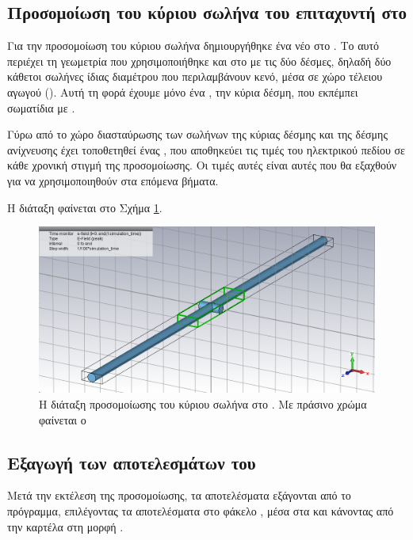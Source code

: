 \subsection{Προσομοίωση του κύριου σωλήνα του επιταχυντή στο }
Για την προσομοίωση του κύριου σωλήνα δημιουργήθηκε ένα νέο  στο .
Το  αυτό περιέχει τη γεωμετρία που χρησιμοποιήθηκε και στο  με τις δύο δέσμες, δηλαδή δύο κάθετοι σωλήνες ίδιας διαμέτρου που περιλαμβάνουν κενό, μέσα σε χώρο τέλειου αγωγού ().
Αυτή τη φορά έχουμε μόνο ένα , την κύρια δέσμη, που εκπέμπει σωματίδια με .

Γύρω από το χώρο διασταύρωσης των σωλήνων της κύριας δέσμης και της δέσμης ανίχνευσης έχει τοποθετηθεί ένας , που αποθηκεύει τις τιμές του ηλεκτρικού πεδίου σε κάθε χρονική στιγμή της προσομοίωσης. 
Οι τιμές αυτές είναι αυτές που θα εξαχθούν για να χρησιμοποιηθούν στα επόμενα βήματα.

Η διάταξη φαίνεται στο Σχήμα \ref{fig:CST-export-main-beam-project-efield-box}.

\begin{figure}[tbh]
\includegraphics[width=\textwidth]{figures/export-main-beam-project-efield-box}
\centering
\caption[Η διάταξη προσομοίωσης του κύριου σωλήνα στο ]{Η διάταξη προσομοίωσης του κύριου σωλήνα στο . Με πράσινο χρώμα φαίνεται ο }
\label{fig:CST-export-main-beam-project-efield-box}
\end{figure}

\subsection{Εξαγωγή των αποτελεσμάτων του }
Μετά την εκτέλεση της προσομοίωσης, τα αποτελέσματα εξάγονται από το πρόγραμμα, επιλέγοντας τα αποτελέσματα στο φάκελο , μέσα στα  και κάνοντας  από την καρτέλα  στη μορφή .

